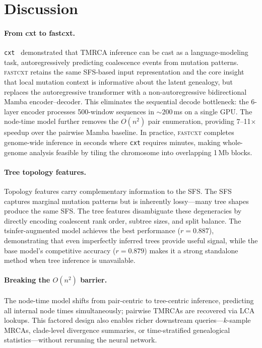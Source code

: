 \documentclass{article}
\begin{document}
\section{Discussion}

\paragraph{From cxt to fastcxt.}
\texttt{cxt}~\citep{korfmann2025cxt} demonstrated that TMRCA inference can be cast as a
language-modeling task, autoregressively predicting coalescence events from mutation patterns.
\textsc{fastcxt} retains the same SFS-based input representation and the core insight that
local mutation context is informative about the latent genealogy, but replaces the
autoregressive transformer with a non-autoregressive bidirectional Mamba encoder--decoder.
This eliminates the sequential decode bottleneck: the 6-layer encoder processes 500-window
sequences in ${\sim}200$\,ms on a single GPU. The node-time model further removes the
$O(n^2)$ pair enumeration, providing 7--11$\times$ speedup over the pairwise Mamba baseline.
In practice, \textsc{fastcxt} completes genome-wide inference in seconds where \texttt{cxt}
requires minutes, making whole-genome analysis feasible by tiling the chromosome into
overlapping 1\,Mb blocks.

\paragraph{Tree topology features.}
Topology features carry complementary information to the SFS. The SFS captures marginal
mutation patterns but is inherently lossy---many tree shapes produce the same SFS. The tree
features disambiguate these degeneracies by directly encoding coalescent rank order, subtree
sizes, and split balance. The tsinfer-augmented model achieves the best performance
($r = 0.887$), demonstrating that even imperfectly inferred trees provide useful signal, while
the base model's competitive accuracy ($r = 0.879$) makes it a strong standalone method when
tree inference is unavailable.

\paragraph{Breaking the $O(n^2)$ barrier.}
The node-time model shifts from pair-centric to tree-centric inference, predicting all internal
node times simultaneously; pairwise TMRCAs are recovered via LCA lookups. This factored design
also enables richer downstream queries---$k$-sample MRCAs, clade-level divergence summaries,
or time-stratified genealogical statistics---without rerunning the neural network.
\end{document}
